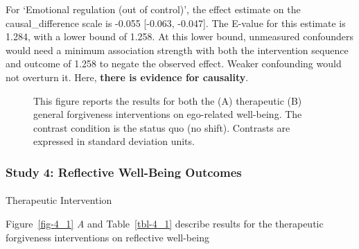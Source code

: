 \documentclass[
  single column]{article}
\makeatletter
\let\oldparagraph\paragraph
\renewcommand{\paragraph}{
    \@ifstar
      \xxxParagraphStar
      \xxxParagraphNoStar
  }
\newcommand{\xxxParagraphStar}[1]{\oldparagraph*{#1}\mbox{}}
\newcommand{\xxxParagraphNoStar}[1]{\oldparagraph{#1}\mbox{}}
\makeatother
\begin{document}
For `Emotional regulation (out of control)', the effect estimate on the
causal\_difference scale is -0.055 {[}-0.063, -0.047{]}. The E-value for
this estimate is 1.284, with a lower bound of 1.258. At this lower
bound, unmeasured confounders would need a minimum association strength
with both the intervention sequence and outcome of 1.258 to negate the
observed effect. Weaker confounding would not overturn it. Here,
\textbf{there is evidence for causality}.

\begin{figure}


\caption{\label{fig-3_1}This figure reports the results for both the (A)
therapeutic (B) general forgiveness interventions on ego-related
well-being. The contrast condition is the status quo (no shift).
Contrasts are expressed in standard deviation units.}

\end{figure}%

\newpage{}

\subsubsection{Study 4: Reflective Well-Being
Outcomes}\label{study-4-reflective-well-being-outcomes}

\paragraph{Therapeutic Intervention}\label{therapeutic-intervention-3}

Figure~\ref{fig-4_1} \emph{A} and Table~\ref{tbl-4_1} describe results
for the therapeutic forgiveness interventions on reflective well-being
\end{document}
